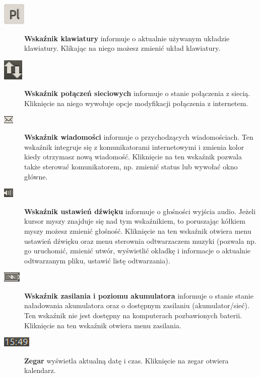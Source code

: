 \begin{description}
\item[\includegraphics{images/unity_wskaznik_klawiatura.png}]\textbf{Wskaźnik klawiatury} informuje o aktualnie używanym układzie klawiatury. Klikając na niego możesz zmienić układ klawiatury.
\item[\includegraphics{images/unity_wskaznik_siec.png}]\textbf{Wskaźnik połączeń sieciowych} informuje o stanie połączenia z siecią. Kliknięcie na niego wywołuje opcje modyfikacji połączenia z internetem.
\item[\includegraphics{images/unity_wskaznik_wiadomosci.png}]\textbf{Wskaźnik wiadomości} informuje o przychodzących wiadomościach. Ten wskaźnik integruje się z komunikatorami internetowymi i zmienia kolor kiedy otrzymasz nową wiadomość. Kliknięcie na ten wskaźnik pozwala także sterować komunikatorem, np. zmienić status lub wywołać okno główne.
\item[\includegraphics{images/unity_wskaznik_dzwiek.png}]\textbf{Wskaźnik ustawień dźwięku} informuje o głośności wyjścia audio. Jeżeli kursor myszy znajduje się nad tym wskaźnikiem, to poruszając kółkiem myszy możesz zmienić głośność. Kliknięcie na ten wskaźnik otwiera menu ustawień dźwięku oraz menu sterownia odtwarzaczem muzyki (pozwala np. go uruchomić, zmienić utwór, wyświetlić okładkę i informacje o aktualnie odtwarzanym pliku, ustawić listę odtwarzania).
\item[\includegraphics{images/unity_wskaznik_zasilanie.png}]\textbf{Wskaźnik zasilania i poziomu akumulatora} informuje o stanie stanie naładowania akumulatora oraz o dostępnym zasilaniu (akumulator/sieć). Ten wskaźnik nie jest dostępny na komputerach pozbawionych baterii. Kliknięcie na ten wskaźnik otwiera menu zasilania.
\item[\includegraphics{images/unity_wskaznik_zegar.png}]\textbf{Zegar} wyświetla aktualną datę i czas. Kliknięcie na zegar otwiera kalendarz.

\end{description}
